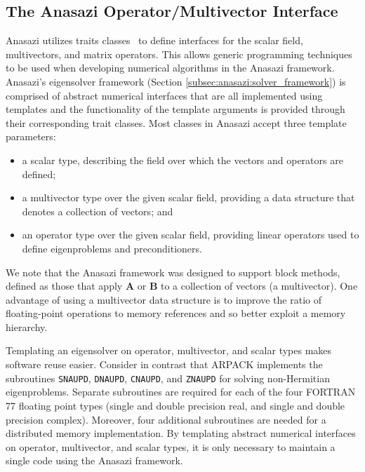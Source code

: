 \documentclass[acmtoms,acmnow]{acmtrans2m}
\begin{document}
\subsection{The Anasazi Operator/Multivector Interface}
\label{sec:anasazi:opvec}

Anasazi utilizes traits classes~\cite{myer:95,veld:96} to define interfaces for the scalar field,
multivectors, and matrix operators. This allows generic programming techniques to
be used when developing numerical algorithms in the Anasazi framework.  
Anasazi's eigensolver framework (Section  
\ref{subsec:anasazi:solver_framework}) is comprised of abstract numerical interfaces
that are all implemented using templates and the functionality of the 
template arguments is provided through their corresponding trait classes.
Most classes in Anasazi accept
three template parameters:
\begin{itemize}
\item
a scalar type, describing the field over which the vectors and
operators are defined;
\item
a multivector type over the given scalar field, providing a
data structure that denotes a collection of vectors; and
\item
an operator type over the given scalar field,
providing linear operators used to define eigenproblems and
preconditioners.
\end{itemize}

We note that the Anasazi framework was designed to support block methods, defined as those
that apply $\mathbf{A}$ or $\mathbf{B}$ to a collection of vectors (a multivector). One
advantage of using a multivector data structure is to improve the ratio of floating-point
operations to memory references and so better exploit a memory hierarchy.

Templating an eigensolver on operator, multivector, and scalar types makes software reuse
easier. Consider in contrast that ARPACK implements the subroutines \texttt{SNAUPD},
\texttt{DNAUPD}, \texttt{CNAUPD}, and \texttt{ZNAUPD} for solving non-Hermitian
eigenproblems. Separate subroutines are required for each of the four FORTRAN 77 floating
point types (single and double precision real, and single and double precision complex).
Moreover, four additional subroutines are needed for a distributed memory implementation.
By templating abstract numerical interfaces on operator, multivector, and scalar types, 
it is only necessary to maintain a single code using the Anasazi framework.
\end{document}
